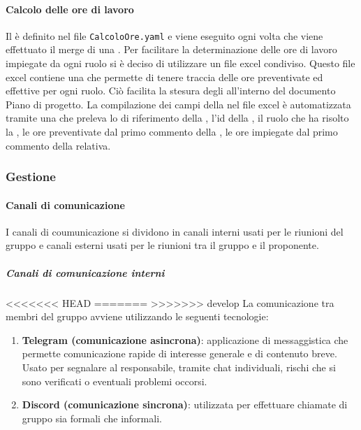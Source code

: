 \paragraph{Calcolo delle ore di lavoro}
\label{par:calcolo_ore_lavoro}
Il  è definito nel file \texttt{CalcoloOre.yaml} e viene eseguito ogni volta che viene effettuato il merge di una .
Per facilitare la determinazione delle ore di lavoro impiegate da ogni ruolo si è deciso di utilizzare un file excel condiviso.
Questo file excel contiene una  che permette di tenere traccia delle ore preventivate ed effettive per ogni ruolo.
Ciò facilita la stesura degli  all'interno del documento Piano di progetto.
La compilazione dei campi della  nel file excel è automatizzata tramite una  che preleva lo  di riferimento della ,
l'id della , il ruolo che ha risolto la , le ore preventivate dal primo commento della , le ore impiegate dal primo commento della  relativa.

\subsubsection{Gestione}
\paragraph{Canali di comunicazione}
I canali di coumunicazione si dividono in canali interni usati per le riunioni del gruppo e canali esterni usati per le riunioni tra il gruppo e il proponente.

\subparagraph{Canali di comunicazione interni}
<<<<<<< HEAD
=======
\label{subpar:canali_interni}
>>>>>>> develop
La comunicazione tra membri del gruppo avviene utilizzando le seguenti tecnologie:
\begin{enumerate}
    \item \textbf{Telegram (comunicazione asincrona)}: applicazione di messaggistica che permette comunicazione rapide di interesse generale e di contenuto breve.
    Usato per segnalare al responsabile, tramite chat individuali, rischi che si sono verificati o eventuali problemi occorsi.

    \item \textbf{Discord (comunicazione sincrona)}: utilizzata per effettuare chiamate di gruppo sia formali che informali.
\end{enumerate}

